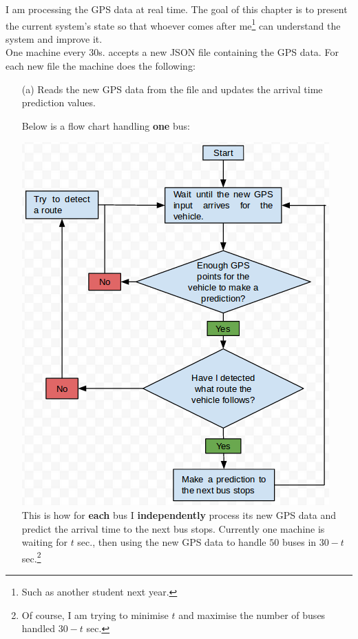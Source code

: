 \documentclass[12pt,a4paper,oneside,openright]{report}
\begin{document}
I am processing the GPS data at real time. The goal of this chapter is to present
the current system's state so that whoever comes after
me\footnote{Such as another student next year.} can understand the system and
improve it. \\

One machine every 30s. accepts a new JSON file containing the GPS data. For each new
file the machine does the following:

\begin{enumerate}

\item[(a)] Reads the new GPS data from the file and updates the arrival time
prediction values.

Below is a flow chart handling
\textbf{one} bus:

\includegraphics[scale = 0.6]{figs/flowchart.png} \\

This is how for \textbf{each} bus I \textbf{independently} process its new GPS data
and predict the arrival time to the next bus stops. Currently one machine is
waiting for $t$ sec., then using the new GPS data to handle $50$ buses in 
$30 - t$ sec.\footnote{Of course, I am trying to minimise $t$ and maximise the number of buses
handled $30 - t$ sec.}


\end{enumerate}
\end{document}
